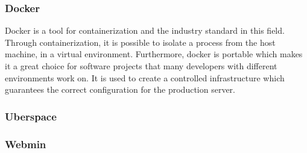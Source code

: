 \Author{\daAuthorTwo}

\subsubsection{Docker}
Docker is a tool for containerization and the industry standard in this field. Through containerization, it is possible to isolate a process from the host machine, in a virtual environment. Furthermore, docker is portable which makes it a great choice for software projects that many developers with different environments work on. It is used to create a controlled infrastructure which guarantees the correct configuration for the production server.

\subsubsection{Uberspace}

\subsubsection{Webmin}
